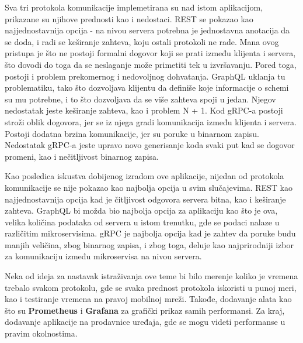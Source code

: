 \documentclass[12pt,oneside]{memoir}
\begin{document}
Sva tri protokola komunikacije implemetirana su nad istom aplikacijom, prikazane su njihove prednosti kao 
i nedostaci. REST se pokazao kao najjednostavnija opcija - na nivou servera potrebna je jednostavna 
anotacija da se doda, i radi se keširanje zahteva, koju ostali protokoli ne rade. Mana ovog pristupa 
je što ne postoji formalni dogovor koji se prati između klijenta i servera, što dovodi do 
toga da se neslaganje može primetiti tek u izvršavanju. Pored toga, postoji i problem prekomernog i nedovoljnog 
dohvatanja.
GraphQL uklanja tu problematiku, tako što dozvoljava klijentu da definiše koje informacije o schemi su mu potrebne,
i to što dozvoljava da se više zahteva spoji u jedan. Njegov nedostatak jeste keširanje zahteva, 
kao i problem N + 1.
Kod gRPC-a postoji stroži oblik dogovora, jer se iz njega gradi komunikacija između klijenta i servera.
Postoji dodatna brzina komunikacije, jer su poruke u binarnom zapisu. Nedostatak gRPC-a jeste upravo 
novo generisanje koda svaki put kad se dogovor promeni, kao i nečitljivost binarnog zapisa. 

Kao posledica iskustva dobijenog izradom ove aplikacije, nijedan od protokola komunikacije se nije pokazao 
kao najbolja opcija u svim slučajevima. REST kao najjednostavnija opcija kad je čitljivost odgovora 
servera bitna, kao i keširanje zahteva. 
GraphQL bi možda bio najbolja opcija za aplikaciju kao što je ova, velika količina podataka od servera u istom trenutku, 
gde se podaci nalaze u različitim mikroservisima. 
gRPC je najbolja opcija kad je zahtev da poruke budu manjih veličina, zbog binarnog zapisa, i zbog toga, 
deluje kao najprirodniji izbor za komunikaciju između mikroservisa na nivou servera. 


Neka od ideja za nastavak istraživanja ove teme bi bilo merenje koliko je vremena trebalo svakom protokolu, 
gde se svaka prednost protokola iskoristi u punoj meri, kao i testiranje vremena na pravoj mobilnoj mreži. 
Takođe, dodavanje alata kao što su \textbf{Prometheus} i \textbf{Grafana} za grafički prikaz samih performansi. 
Za kraj, dodavanje aplikacije na prodavnice uređaja, gde se mogu videti performanse u pravim okolnostima.


\end{document}
